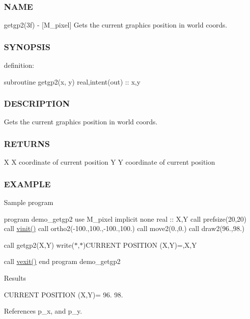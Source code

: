 \subsubsection*{N\+A\+ME}

getgp2(3f) -\/ \mbox{[}M\+\_\+pixel\mbox{]} Gets the current graphics position in world coords. 

\subsubsection*{S\+Y\+N\+O\+P\+S\+IS}

definition\+:

subroutine getgp2(x, y) real,intent(out) \+:\+: x,y

\subsubsection*{D\+E\+S\+C\+R\+I\+P\+T\+I\+ON}

Gets the current graphics position in world coords.

\subsubsection*{R\+E\+T\+U\+R\+NS}

X X coordinate of current position Y Y coordinate of current position

\subsubsection*{E\+X\+A\+M\+P\+LE}

Sample program

program demo\+\_\+getgp2 use M\+\_\+pixel implicit none real \+:\+: X,Y call prefsize(20,20) call \hyperlink{namespacem__pixel_ac03ca8f23fdadb60599b6ea4dc87a6d9}{vinit()} call ortho2(-\/100.,100.,-\/100.,100.) call move2(0.,0.) call draw2(96.,98.)

call getgp2(\+X,\+Y) write($\ast$,$\ast$)\textquotesingle{}C\+U\+R\+R\+E\+NT P\+O\+S\+I\+T\+I\+ON (X,Y)=\textquotesingle{},X,Y

call \hyperlink{namespacem__pixel_a19ad6b65752322b0029a62cc0ebec3e8}{vexit()} end program demo\+\_\+getgp2

Results

C\+U\+R\+R\+E\+NT P\+O\+S\+I\+T\+I\+ON (X,Y)= 96. 98. 

References p\+\_\+x, and p\+\_\+y.

